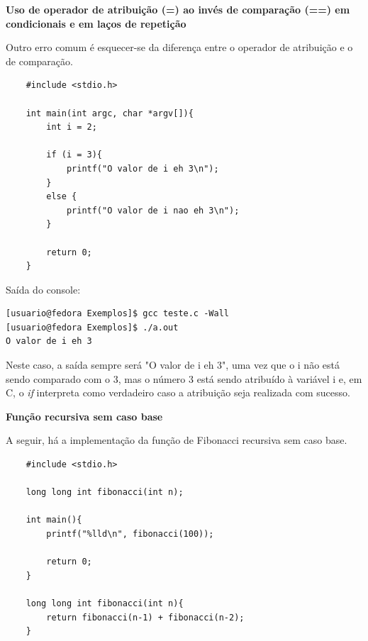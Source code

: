 \documentclass[12pt]{article}
\newcommand\tab[1][1cm]{\hspace*{#1}}
\begin{document}
\hspace{2cm}
\par\tab\textbf{Uso de operador de atribuição (=) ao invés de comparação (==) em condicionais e em laços de repetição}

\par\tab Outro erro comum é esquecer-se da diferença entre o operador de atribuição e o de comparação.

\hspace{0.25cm}
\begin{lstlisting}
    #include <stdio.h>
    
    int main(int argc, char *argv[]){
        int i = 2;
        
        if (i = 3){
            printf("O valor de i eh 3\n");
        }
        else {
            printf("O valor de i nao eh 3\n");
        }
        
        return 0;
    }
\end{lstlisting}

\par\tab Saída do console:

\hspace{0.25cm}
\begin{tcolorbox}[colback=black!5!white,colframe=black!75!white,title=Console: usuario@fedora:\~/Exemplos]
    \begin{verbatim}
[usuario@fedora Exemplos]$ gcc teste.c -Wall
[usuario@fedora Exemplos]$ ./a.out
O valor de i eh 3
    \end{verbatim}
\end{tcolorbox}

\par\tab Neste caso, a saída sempre será "O valor de i eh 3", uma vez que o i não está sendo comparado com o 3, mas o número 3 está sendo atribuído à variável i e, em C, o \textit{if} interpreta como verdadeiro caso a atribuição seja realizada com sucesso.

\hspace{2cm}
\par\tab\textbf{Função recursiva sem caso base}

\par\tab A seguir, há a implementação da função de Fibonacci recursiva sem caso base.

\hspace{0.25cm}
\begin{lstlisting}
    #include <stdio.h>
    
    long long int fibonacci(int n);

    int main(){
        printf("%lld\n", fibonacci(100));
    
        return 0;
    }
    
    long long int fibonacci(int n){
        return fibonacci(n-1) + fibonacci(n-2);
    }
\end{lstlisting}
\end{document}
